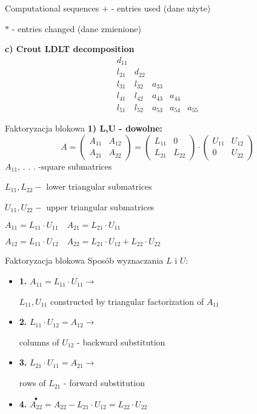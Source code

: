 \begin{frame}{Computational sequences}
$+$ - entries used (dane użyte)

$*$ - entries changed (dane zmienione)

\textbf{c) Crout LDLT decomposition}
$$
\begin{array}{lllll}
d_{11}\\
l_{21} & d_{22}\\
l_{31} & l_{32} & a_{33}\\
l_{41} & l_{42} & a_{43} & a_{44} \\
l_{51} & l_{52} & a_{53} & a_{54} &  a_{55}
\end{array}
$$
\end{frame}
\begin{frame}{Faktoryzacja blokowa}
\textbf{ 1) L,U - dowolne: }
$$
A=\left(\begin{array}{ll}
A_{11} & A_{12}\\
A_{21} & A_{22}
\end{array}\right)=\left(\begin{array}{ll}
L_{11} & 0\\
L_{21} & L_{22}
\end{array}\right)\cdot\left(\begin{array}{ll}
U_{11} & U_{12}\\
0 & U_{22}
\end{array}\right)
$$
$A_{11}$, . . . -square submatrices 

$L_{11}, L_{22}-$ lower triangular submatrices 

$U_{11}, U_{22}-$ upper triangular submatrices
\begin{flushright}
$
A_{11}=L_{11}\cdot U_{11}\quad A_{21}=L_{21}\cdot U_{11}
$
\end{flushright}
\begin{flushright}
$
A_{12}=L_{11}\cdot U_{12}\quad A_{22}=L_{21}\cdot U_{12}+L_{22}\cdot U_{22}
$
\end{flushright}

\end{frame}
\begin{frame}{Faktoryzacja blokowa}
Sposób wyznaczania $L$ i $U$:

\begin{itemize}
\item   \textbf{1.} $A_{11}=L_{11}\cdot U_{11}\rightarrow$

$L_{11}, U_{11}$ constructed by triangular factorization of $A_{11}$
\item \textbf{2.} $ L_{11}\cdot U_{12}=A_{12}\rightarrow$

columns of $U_{12}$ - backward substitution

\item \textbf{3.} $L_{21}\cdot U_{11}=A_{21}\rightarrow$

rows of $L_{21}$ - forward substitution 
\item \textbf{4.}  $\overset{\bullet}{A_{22}}=A_{22}-L_{21}\cdot U_{12}=L_{22}\cdot U_{22}$
\end{itemize}

\end{frame}
